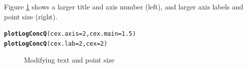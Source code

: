 \documentclass[a4paper,11pt]{article}\usepackage{graphicx, color}
\makeatletter
\newcommand{\hlfunctioncall}[1]{\textcolor[rgb]{0.501960784313725,0,0.329411764705882}{\textbf{#1}}}%
\newenvironment{kframe}{%
 \def\at@end@of@kframe{}%
 \ifinner\ifhmode%
  \def\at@end@of@kframe{\end{minipage}}%
  \begin{minipage}{\columnwidth}%
 \fi\fi%
 \def\FrameCommand##1{\hskip\@totalleftmargin \hskip-\fboxsep
 \colorbox{shadecolor}{##1}\hskip-\fboxsep
     \hskip-\linewidth \hskip-\@totalleftmargin \hskip\columnwidth}%
 \MakeFramed {\advance\hsize-\width
   \@totalleftmargin\z@ \linewidth\hsize
   \@setminipage}}%
 {\par\unskip\endMakeFramed%
 \at@end@of@kframe}
\newenvironment{knitrout}{}{} %
\makeatother
\begin{document}
Figure \ref{fig:adjustSize} shows a larger title and axis number (left), and larger axis labels and point size (right).
\begin{knitrout}
\color{fgcolor}\begin{kframe}
\begin{alltt}
\hlfunctioncall{plotLogConcQ}(cex.axis=2,cex.main=1.5)
\hlfunctioncall{plotLogConcQ}(cex.lab=2,cex=2)
\end{alltt}
\end{kframe}\begin{figure}[]
\caption[Modifying text and point size]{Modifying text and point size\label{fig:adjustSize}}
\end{figure}


\end{knitrout}
\end{document}
